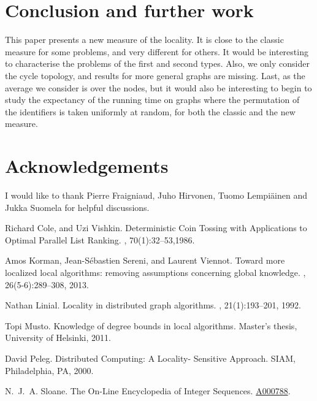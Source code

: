 \documentclass{sig-alternate-2013}
\begin{document}
\section{Conclusion and further work}

This paper presents a new measure of the locality. It is close to the classic measure for some problems, and very different for others. It would be interesting to characterise the problems of the first and second types. Also, we only consider the cycle topology, and results for more general graphs are missing. Last, as the average we consider is over the nodes, but it would also be interesting to begin to study the expectancy of the running time on graphs where the permutation of the identifiers is taken uniformly at random, for both the classic and the new measure.

\section*{Acknowledgements}
I would like to thank Pierre Fraigniaud, Juho Hirvonen, Tuomo Lempi\"ainen and Jukka Suomela for helpful discussions.

\begin{thebibliography}{1}

Richard Cole, and Uzi Vishkin.
\newblock Deterministic Coin Tossing with Applications to Optimal Parallel List Ranking.
, 70(1):32--53,1986.

Amos Korman, Jean{-}S{\'{e}}bastien Sereni, and Laurent Viennot.
\newblock Toward more localized local algorithms: removing assumptions
  concerning global knowledge.
, 26(5-6):289--308, 2013.

Nathan Linial.
\newblock Locality in distributed graph algorithms.
, 21(1):193--201, 1992.

Topi Musto.
\newblock Knowledge of degree bounds in local algorithms.
\newblock Master's thesis, University of Helsinki, 2011.

David Peleg.
\newblock Distributed Computing: A Locality- Sensitive Approach. 
\newblock SIAM, Philadelphia, PA, 2000.

N.~J.~A. Sloane.
\newblock The {O}n-{L}ine {E}ncyclopedia of {I}nteger {S}equences.
\newblock \href{http://oeis.org/A000788}{A000788}.



\end{thebibliography}
\end{document}
